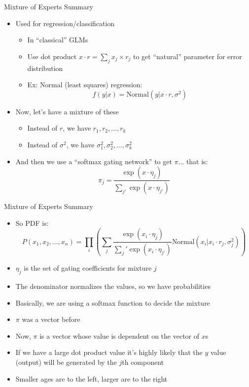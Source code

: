 \documentclass[aspectratio=169]{beamer}
\begin{document}
\begin{frame}{Mixture of Experts Summary}

\begin{itemize}
\item Used for regression/classification
\begin{itemize}
	\item In ``classical'' GLMs
	\item Use dot product $x \cdot r = \sum_j x_j \times r_j$ to get ``natural'' parameter for error distribution
	\item Ex: Normal (least squares) regression:
	$$f (y | x) = \textrm{Normal} (y | x \cdot r, \sigma^2)$$
\end{itemize}
\item Now, let's have a mixture of these
\begin{itemize}
	\item Instead of $r$, we have $r_1, r_2, ..., r_k$
	\item Instead of $\sigma^2$, we have $\sigma^2_1, \sigma^2_2, ..., \sigma^2_k$
\end{itemize}
\item And then we use a ``softmax gating network'' to get $\pi$... that is:
	$$\pi_j = \frac{\exp (x \cdot \eta_j)}{\sum_{j'} \exp (x \cdot \eta_{j'})}$$
\end{itemize}
\end{frame}

\begin{frame}{Mixture of Experts Summary}

\begin{itemize}
\item So PDF is:
$$P(x_1, x_2, ..., x_n) = \prod_i \left( \sum_j \frac{\exp (x_i \cdot \eta_j)}{\sum_j' \exp (x_i \cdot \eta_{j'})}  \textrm{Normal} (x_i | x_i \cdot r_j, \sigma^2_j) \right)$$
\item $\eta_j$ is the set of gating coefficients for mixture $j$
\item The denominator normalizes the values, so we have probabilities
\item Basically, we are using a softmax function to decide the mixture
\item $\pi$ was a vector before
\item Now, $\pi$ is a vector whose value is dependent on the vector of $x$s
\item If we have a large dot product value it's highly likely that the $y$ value (output) will be generated by the $j$th component
\item Smaller ages are to the left, larger are to the right
\end{itemize}

\end{frame}
\end{document}
